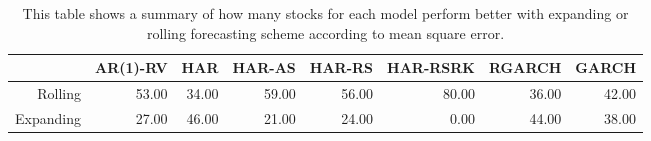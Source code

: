 \begin{table}[ht]
\centering
\begin{tabular}{rrrrrrrr}
  \hline
 & AR(1)-RV & HAR & HAR-AS & HAR-RS & HAR-RSRK & RGARCH & GARCH \\ 
  \hline
Rolling & 53.00 & 34.00 & 59.00 & 56.00 & 80.00 & 36.00 & 42.00 \\ 
  Expanding & 27.00 & 46.00 & 21.00 & 24.00 & 0.00 & 44.00 & 38.00 \\ 
   \hline
\end{tabular}
\caption[Better scheme MSE summary]{This table shows a summary of how many stocks for each model perform better with expanding or rolling forecasting scheme according to mean square error. } 
\label{Table:Better_MSE_summary}
\end{table}
